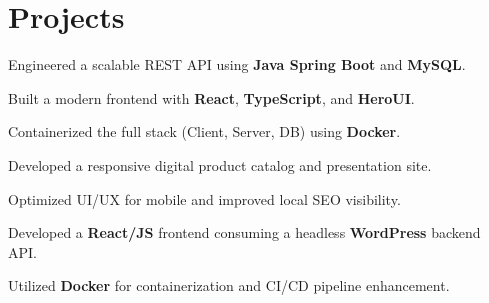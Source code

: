 \documentclass[]{deedy-resume-reversed}
\begin{document}
\begin{minipage}[t]{0.65\textwidth}

\section{Projects}

\begin{tightemize}
\item Engineered a scalable REST API using \textbf{Java Spring Boot} and \textbf{MySQL}.
\item Built a modern frontend with \textbf{React}, \textbf{TypeScript}, and \textbf{HeroUI}.
\item Containerized the full stack (Client, Server, DB) using \textbf{Docker}.
\end{tightemize}
\sectionsep

\begin{tightemize}
\item Developed a responsive digital product catalog and presentation site.
\item Optimized UI/UX for mobile and improved local SEO visibility.
\end{tightemize}

\begin{tightemize}
\item Developed a \textbf{React/JS} frontend consuming a headless \textbf{WordPress} backend API.
\item Utilized \textbf{Docker} for containerization and CI/CD pipeline enhancement.
\end{tightemize}
\sectionsep

\sectionsep

\end{minipage}
\hfill
\end{document}
